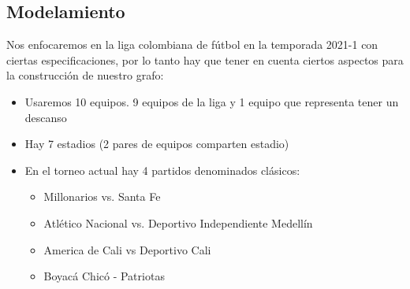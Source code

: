 \documentclass[11pt]{article}
\begin{document}
\begin{multicols}{2}
        \section{Modelamiento}
            Nos enfocaremos en la liga colombiana de fútbol en la temporada 2021-1 con ciertas especificaciones, por lo tanto hay que 
            tener en cuenta ciertos aspectos para la construcción de nuestro grafo:
            \begin{itemize}
                \item  Usaremos 10 equipos. 9 equipos de la liga y 1 equipo que representa tener un descanso
                \item  Hay 7 estadios (2 pares de equipos comparten estadio)
                \item  En el torneo actual hay 4 partidos denominados clásicos:
                \begin{itemize}
                    \item  Millonarios vs. Santa Fe
                    \item  Atlético Nacional vs. Deportivo Independiente Medellín
                    \item America de Cali vs Deportivo Cali
                    \item  Boyacá Chicó - Patriotas
                \end{itemize}
            \end{itemize}


\end{multicols}
\end{document}
